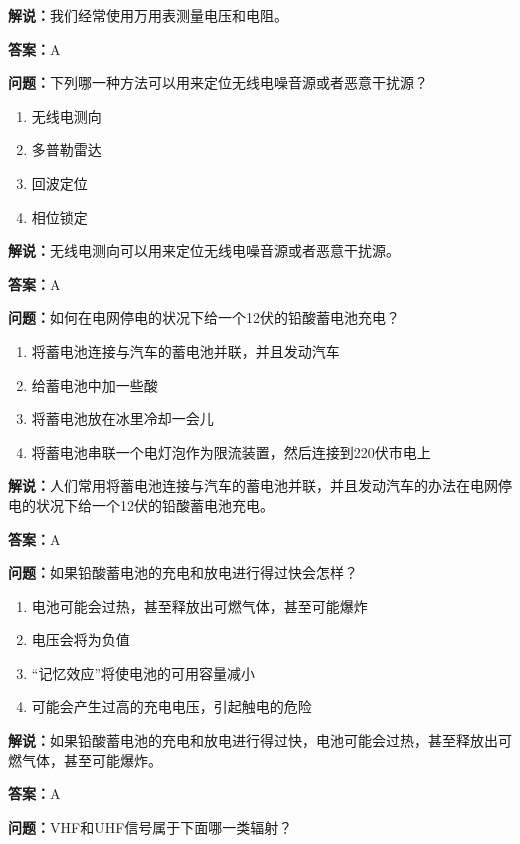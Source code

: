 \documentclass[UTF8]{ctexbook}
\begin{document}
\textbf{解说：}我们经常使用万用表测量电压和电阻。%

\textbf{答案：}A

\textbf{问题：}下列哪一种方法可以用来定位无线电噪音源或者恶意干扰源？

\begin{enumerate}[label=\Alph*), leftmargin=3em]
  \item 无线电测向
  \item 多普勒雷达
  \item 回波定位
  \item 相位锁定
\end{enumerate}

\textbf{解说：}无线电测向可以用来定位无线电噪音源或者恶意干扰源。%

\textbf{答案：}A

\textbf{问题：}如何在电网停电的状况下给一个12伏的铅酸蓄电池充电？

\begin{enumerate}[label=\Alph*), leftmargin=3em]
  \item 将蓄电池连接与汽车的蓄电池并联，并且发动汽车
  \item 给蓄电池中加一些酸
  \item 将蓄电池放在冰里冷却一会儿
  \item 将蓄电池串联一个电灯泡作为限流装置，然后连接到220伏市电上
\end{enumerate}

\textbf{解说：}人们常用将蓄电池连接与汽车的蓄电池并联，并且发动汽车的办法在电网停电的状况下给一个12伏的铅酸蓄电池充电。%

\textbf{答案：}A

\textbf{问题：}如果铅酸蓄电池的充电和放电进行得过快会怎样？

\begin{enumerate}[label=\Alph*), leftmargin=3em]
  \item 电池可能会过热，甚至释放出可燃气体，甚至可能爆炸
  \item 电压会将为负值
  \item “记忆效应”将使电池的可用容量减小
  \item 可能会产生过高的充电电压，引起触电的危险
\end{enumerate}

\textbf{解说：}如果铅酸蓄电池的充电和放电进行得过快，电池可能会过热，甚至释放出可燃气体，甚至可能爆炸。%

\textbf{答案：}A

\textbf{问题：}VHF和UHF信号属于下面哪一类辐射？
\end{document}
